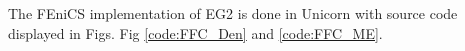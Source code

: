 The FEniCS implementation of EG2 is done in Unicorn
\cite{chapter:implementation:unicorn} with source code displayed in Figs.
Fig \ref{code:FFC_Den} and \ref{code:FFC_ME}.

%


